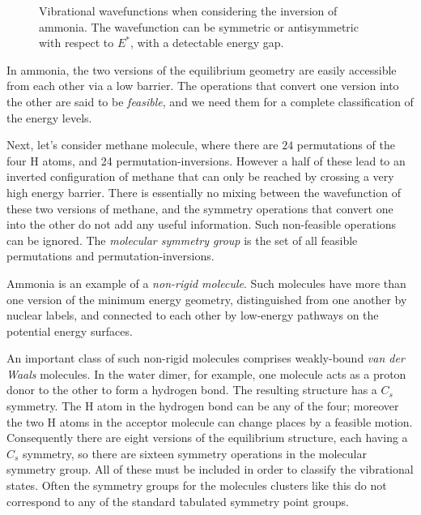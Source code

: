 \documentclass{article}
\theoremstyle{plain}\theoremheaderfont{\normalfont\itshape}\theorembodyfont{\rmfamily}\theoremseparator{.}\newtheorem*{rem}{Remark}\newtheorem*{ex}{Example}\newtheorem*{proof}{Proof}\newtheorem*{altp}{Alternative proof}
\theoremstyle{plain}\theoremheaderfont{\normalfont\bfseries}\theorembodyfont{\rmfamily}\theoremseparator{.}\newtheorem{thm}{Theorem}[section]\newtheorem{lem}[thm]{Lemma}\newtheorem{prop}[thm]{Proposition}\newtheorem*{cor}{Corollary}\newtheorem{defn}[thm]{Definition}\newtheorem{clm}[thm]{Claim}\newtheorem{clminproof}{Claim}\newtheorem*{law}{Law}\newtheorem{pos}[thm]{Postulate}
\theoremstyle{break}\theoremheaderfont{\normalfont\itshape}\theorembodyfont{\rmfamily}\theoremseparator{.\medskip}\newtheorem*{proofskip}{Proof}\newtheorem*{exs}{Examples}\newtheorem*{rems}{Remarks}
\theoremstyle{break}\theoremheaderfont{\normalfont\bfseries}\theorembodyfont{\rmfamily}\theoremseparator{.\medskip}\newtheorem{lemskip}[thm]{Lemma}\newtheorem{defnskip}[thm]{Definition}\newtheorem{propskip}[thm]{Proposition}\newtheorem{thmskip}[thm]{Theorem}
\numberwithin{equation}{section}
\begin{document}
    \begin{figure}
        \centering
        \caption{Vibrational wavefunctions when considering the inversion of ammonia. The wavefunction can be symmetric or antisymmetric with respect to \(E^*\), with a detectable energy gap.}
    \end{figure}

    In ammonia, the two versions of the equilibrium geometry are easily accessible from each other via a low barrier. The operations that convert one version into the other are said to be \textit{feasible}, and we need them for a complete classification of the energy levels.

    Next, let's consider methane molecule, where there are \(24\) permutations of the four \(\mathrm{H}\) atoms, and 24 permutation-inversions. However a half of these lead to an inverted configuration of methane that can only be reached by crossing a very high energy barrier. There is essentially no mixing between the wavefunction of these two versions of methane, and the symmetry operations that convert one into the other do not add any useful information. Such non-feasible operations can be ignored. The \textit{molecular symmetry group} is the set of all feasible permutations and permutation-inversions.

    Ammonia is an example of a \textit{non-rigid molecule}. Such molecules have more than one version of the minimum energy geometry, distinguished from one another by nuclear labels, and connected to each other by low-energy pathways on the potential energy surfaces.

    An important class of such non-rigid molecules comprises weakly-bound \textit{van der Waals} molecules. In the water dimer, for example, one molecule acts as a proton donor to the other to form a hydrogen bond. The resulting structure has a \(C_s\) symmetry. The \(\mathrm{H}\) atom in the hydrogen bond can be any of the four; moreover the two \(\mathrm{H}\) atoms in the acceptor molecule can change places by a feasible motion. Consequently there are eight versions of the equilibrium structure, each having a \(C_s\) symmetry, so there are sixteen symmetry operations in the molecular symmetry group. All of these must be included in order to classify the vibrational states. Often the symmetry groups for the molecules clusters like this do not correspond to any of the standard tabulated symmetry point groups.
\end{document}
